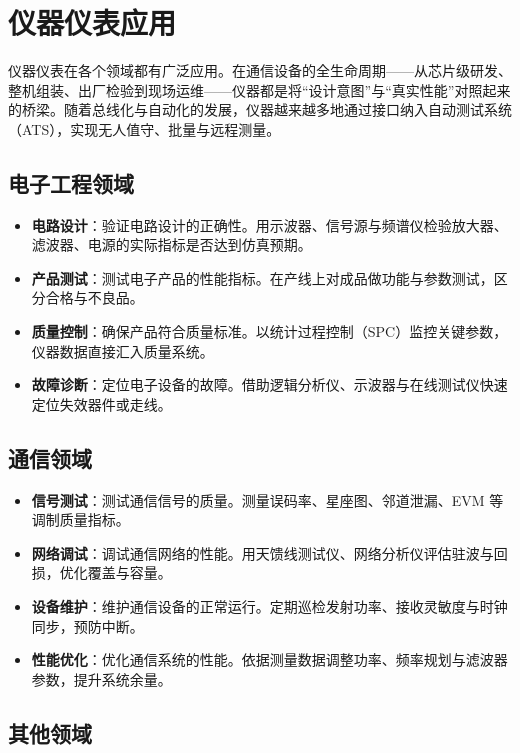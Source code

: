 \section{仪器仪表应用}
\label{sec:instruments_applications}

仪器仪表在各个领域都有广泛应用。在通信设备的全生命周期——从芯片级研发、整机组装、出厂检验到现场运维——仪器都是将“设计意图”与“真实性能”对照起来的桥梁。随着总线化与自动化的发展，仪器越来越多地通过接口纳入自动测试系统（ATS），实现无人值守、批量与远程测量。

\subsection{电子工程领域}

\begin{itemize}
    \item \textbf{电路设计}：验证电路设计的正确性。用示波器、信号源与频谱仪检验放大器、滤波器、电源的实际指标是否达到仿真预期。
    \item \textbf{产品测试}：测试电子产品的性能指标。在产线上对成品做功能与参数测试，区分合格与不良品。
    \item \textbf{质量控制}：确保产品符合质量标准。以统计过程控制（SPC）监控关键参数，仪器数据直接汇入质量系统。
    \item \textbf{故障诊断}：定位电子设备的故障。借助逻辑分析仪、示波器与在线测试仪快速定位失效器件或走线。
\end{itemize}

\subsection{通信领域}

\begin{itemize}
    \item \textbf{信号测试}：测试通信信号的质量。测量误码率、星座图、邻道泄漏、EVM 等调制质量指标。
    \item \textbf{网络调试}：调试通信网络的性能。用天馈线测试仪、网络分析仪评估驻波与回损，优化覆盖与容量。
    \item \textbf{设备维护}：维护通信设备的正常运行。定期巡检发射功率、接收灵敏度与时钟同步，预防中断。
    \item \textbf{性能优化}：优化通信系统的性能。依据测量数据调整功率、频率规划与滤波器参数，提升系统余量。
\end{itemize}

\subsection{其他领域}

